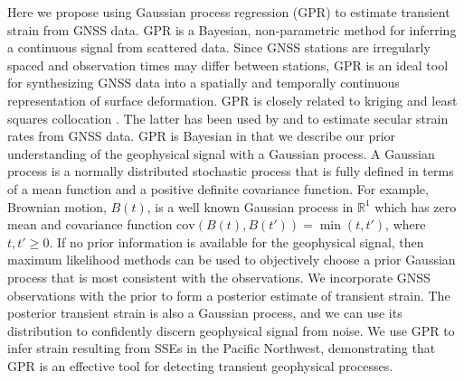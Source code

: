 \documentclass[extra,mreferee]{gji}
\begin{document}
Here we propose using Gaussian process regression (GPR) \citep{Rasmussen2006} to estimate transient strain from GNSS data. GPR is a Bayesian, non-parametric method for inferring a continuous signal from scattered data. Since GNSS stations are irregularly spaced and observation times may differ between stations, GPR is an ideal tool for synthesizing GNSS data into a spatially and temporally continuous representation of surface deformation. GPR is closely related to kriging \citep{Cressie1992} and least squares collocation \citep{Moritz1978}. The latter has been used by \citet{Kato1998} and \citet{El-Fiky1999} to estimate secular strain rates from GNSS data. GPR is Bayesian in that we describe our prior understanding of the geophysical signal with a Gaussian process. A Gaussian process is a normally distributed stochastic process that is fully defined in terms of a mean function and a positive definite covariance function. For example, Brownian motion, $B(t)$, is a well known Gaussian process in $\mathbb{R}^1$ which has zero mean and covariance function $\mathrm{cov}(B(t),B(t')) = \min(t,t')$, where $t,t' \ge 0$. If no prior information is available for the geophysical signal, then maximum likelihood methods can be used to objectively choose a prior Gaussian process that is most consistent with the observations.  We incorporate GNSS observations with the prior to form a posterior estimate of transient strain.  The posterior transient strain is also a Gaussian process, and we can use its distribution to confidently discern geophysical signal from noise. We use GPR to infer strain resulting from SSEs in the Pacific Northwest, demonstrating that GPR is an effective tool for detecting transient geophysical processes. 
\end{document}
